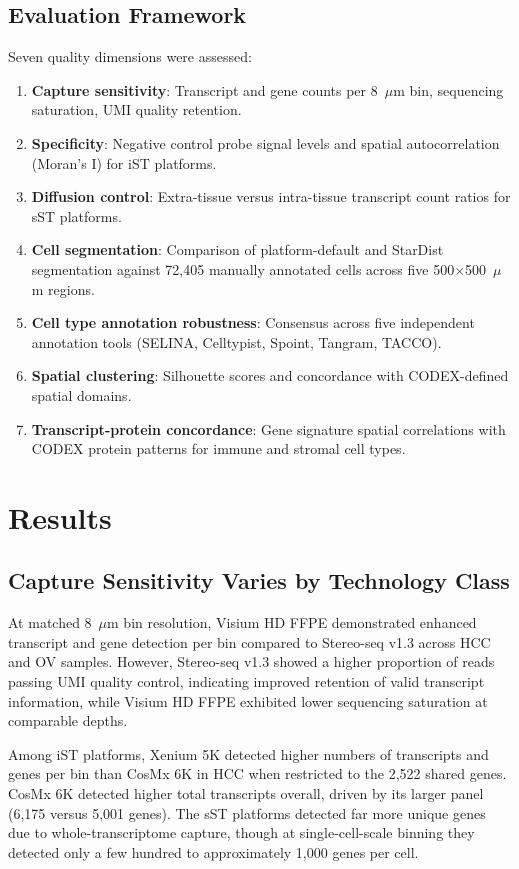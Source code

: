\documentclass[11pt]{article}
\begin{document}
\subsection{Evaluation Framework}
Seven quality dimensions were assessed:
\begin{enumerate}
    \item \textbf{Capture sensitivity}: Transcript and gene counts per 8~$\mu$m bin, sequencing saturation, UMI quality retention.
    \item \textbf{Specificity}: Negative control probe signal levels and spatial autocorrelation (Moran's I) for iST platforms.
    \item \textbf{Diffusion control}: Extra-tissue versus intra-tissue transcript count ratios for sST platforms.
    \item \textbf{Cell segmentation}: Comparison of platform-default and StarDist segmentation against 72,405 manually annotated cells across five 500$\times$500~$\mu$m regions.
    \item \textbf{Cell type annotation robustness}: Consensus across five independent annotation tools (SELINA, Celltypist, Spoint, Tangram, TACCO).
    \item \textbf{Spatial clustering}: Silhouette scores and concordance with CODEX-defined spatial domains.
    \item \textbf{Transcript-protein concordance}: Gene signature spatial correlations with CODEX protein patterns for immune and stromal cell types.
\end{enumerate}

\section{Results}

\subsection{Capture Sensitivity Varies by Technology Class}
At matched 8~$\mu$m bin resolution, Visium HD FFPE demonstrated enhanced transcript and gene detection per bin compared to Stereo-seq v1.3 across HCC and OV samples. However, Stereo-seq v1.3 showed a higher proportion of reads passing UMI quality control, indicating improved retention of valid transcript information, while Visium HD FFPE exhibited lower sequencing saturation at comparable depths.

Among iST platforms, Xenium 5K detected higher numbers of transcripts and genes per bin than CosMx 6K in HCC when restricted to the 2,522 shared genes. CosMx 6K detected higher total transcripts overall, driven by its larger panel (6,175 versus 5,001 genes). The sST platforms detected far more unique genes due to whole-transcriptome capture, though at single-cell-scale binning they detected only a few hundred to approximately 1,000 genes per cell.
\end{document}
